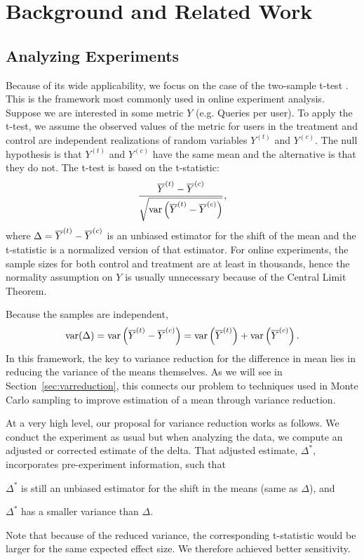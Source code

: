 \documentclass{sig-alternate}
\begin{document}
\section{Background and Related Work}
\subsection{Analyzing Experiments}
Because of its wide applicability, we focus on the case of the two-sample t-test \citep{studentt,allofstat}. This is the framework most commonly used in online experiment analysis. Suppose we are interested in some metric $Y$ (e.g. Queries per user). To apply the t-test, we assume the observed values of the metric for users in the treatment and control are independent realizations of random variables $Y^{(t)}$ and $Y^{(c)}$. The null hypothesis is that $Y^{(t)}$ and $Y^{(c)}$ have the same mean and the alternative is that they do not. 
The t-test is based on the t-statistic: 
\begin{align}\label{zstat}
\frac{\overline{Y}^{(t)} - \overline{Y}^{(c)}}{\sqrt{\mathrm{var} \left(\overline{Y}^{(t)} - \overline{Y}^{(c)}\right)}},
\end{align}
where $\Delta=\overline{Y}^{(t)} - \overline{Y}^{(c)}$ is an unbiased estimator for the shift of the mean and the t-statistic is a normalized version of that estimator. 
For online experiments, the sample sizes for both control and treatment are at least in thousands, hence the normality assumption on $Y$ is usually unnecessary because of the Central Limit Theorem.

Because the samples are independent, $$\mathrm{var}(\Delta)=\mathrm{var} \left(\overline{Y}^{(t)} - \overline{Y}^{(c)}\right) = \mathrm{var}\left(\overline{Y}^{(t)}\right)+\mathrm{var}\left(\overline{Y}^{(c)}\right).$$ 
In this framework, the key to variance reduction for the difference in mean lies in reducing the variance of the means themselves. As we will see in Section~\ref{sec:varreduction}, this connects our problem to techniques used in Monte Carlo sampling to improve estimation of a mean through variance reduction. 

At a very high level, our proposal for variance reduction works as follows. We conduct the experiment as usual but when analyzing the data, we compute an adjusted or corrected estimate of the delta. That adjusted estimate, $\Delta^*$, incorporates pre-experiment information, such that 
\begin{compactitem}
\item $\Delta^*$ is still an unbiased estimator for the shift in the means (same as $\Delta$), and
\item $\Delta^*$ has a smaller variance than $\Delta$. 
\end{compactitem}
Note that because of the reduced variance, the corresponding t-statistic would be larger for the same expected effect size. We therefore achieved better sensitivity.
\end{document}
